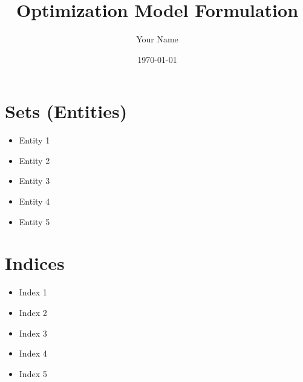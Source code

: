\documentclass{article}
\title{Optimization Model Formulation}
\author{Your Name}
\date{\today}
\begin{document}
\maketitle
\tableofcontents
\newpage

\section{Sets (Entities)}
\begin{itemize}
    \item Entity 1
    \item Entity 2
    \item Entity 3
    \item Entity 4
    \item Entity 5
\end{itemize}

\section{Indices}
\begin{itemize}
    \item Index 1
    \item Index 2
    \item Index 3
    \item Index 4
    \item Index 5
\end{itemize}
\end{document}

